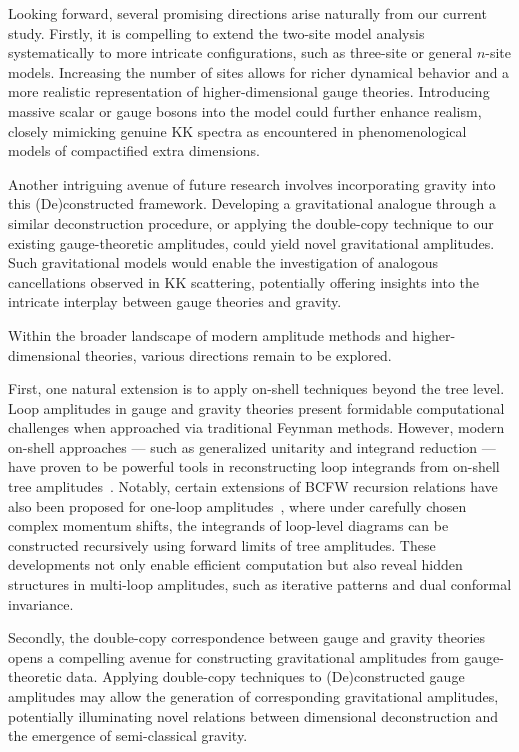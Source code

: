 \documentclass[12pt]{article}
\numberwithin{equation}{section}
\begin{document}
Looking forward, several promising directions arise naturally from our current study. Firstly, it is compelling to extend the two-site model analysis systematically to more intricate configurations, such as three-site or general \( n \)-site models. Increasing the number of sites allows for richer dynamical behavior and a more realistic representation of higher-dimensional gauge theories. Introducing massive scalar or gauge bosons into the model could further enhance realism, closely mimicking genuine KK spectra as encountered in phenomenological models of compactified extra dimensions.

Another intriguing avenue of future research involves incorporating gravity into this (De)constructed framework. Developing a gravitational analogue through a similar deconstruction procedure, or applying the double-copy technique to our existing gauge-theoretic amplitudes, could yield novel gravitational amplitudes. Such gravitational models would enable the investigation of analogous cancellations observed in KK scattering, potentially offering insights into the intricate interplay between gauge theories and gravity.

Within the broader landscape of modern amplitude methods and higher-dimensional theories, various directions remain to be explored.

First, one natural extension is to apply on-shell techniques beyond the tree level. Loop amplitudes in gauge and gravity theories present formidable computational challenges when approached via traditional Feynman methods. However, modern on-shell approaches — such as generalized unitarity and integrand reduction — have proven to be powerful tools in reconstructing loop integrands from on-shell tree amplitudes~\cite{Bern:1994zx}. Notably, certain extensions of BCFW recursion relations have also been proposed for one-loop amplitudes~\cite{Kharel:2011vz}, where under carefully chosen complex momentum shifts, the integrands of loop-level diagrams can be constructed recursively using forward limits of tree amplitudes. These developments not only enable efficient computation but also reveal hidden structures in multi-loop amplitudes, such as iterative patterns and dual conformal invariance.


Secondly, the double-copy correspondence between gauge and gravity theories~\cite{Bern:2010ue} opens a compelling avenue for constructing gravitational amplitudes from gauge-theoretic data. Applying double-copy techniques to (De)constructed gauge amplitudes may allow the generation of corresponding gravitational amplitudes, potentially illuminating novel relations between dimensional deconstruction and the emergence of semi-classical gravity.
\end{document}
